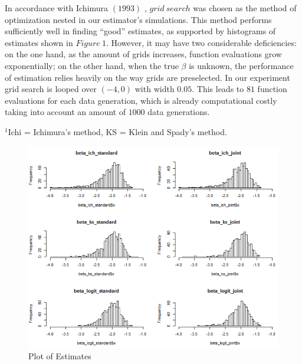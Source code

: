 \documentclass[a4paper]{article}
\begin{document}
In accordance with Ichimura $(1993)$ \cite{[6]}, $grid\ search$ was chosen as the method of optimization nested in our estimator's simulations. This method performs sufficiently well in finding ``good'' estimates, as supported by histograms of estimates shown in $Figure\ 1$. However, it may have two considerable deficiencies: on the one hand, as the amount of grids increases, function evaluations grow exponentially; on the other hand, when the true $\beta$ is unknown, the performance of estimation relies heavily on the way grids are preselected. In our experiment grid search is looped over $(-4,0)$ with width $0.05$. This leads to $81$ function evaluations for each data generation, which is already computational costly taking into account an amount of $1000$ data generations.

\begin{table}[H]
\caption {Bias and Root Mean Squared Error Comparison} \label{tab:bias and mean squared error}


\centering
{}

$^1$Ichi = Ichimura's method, KS = Klein and Spady's method.

\end{table}

\begin{figure}[H]
  \caption{Plot of Estimates}
  \includegraphics[width=\linewidth]{plot_comparison.png}
 
  \label{fig:plot of estimates}
\end{figure}
\end{document}
